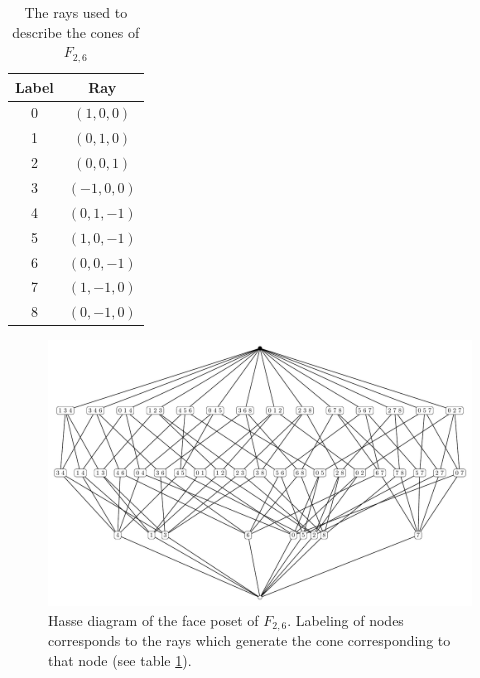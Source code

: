 \documentclass[12pt,letter]{article}
\begin{document}
\begin{table}[h!]\begin{centering}
	\begin{tabular}{c|c}
		Label & Ray\\
		\hline\hline
	0&	$(1, 0, 0)$\\
	1&$(0, 1, 0)$\\
2&	$(	0, 0 ,1)$\\
3&		$(-1, 0, 0)$\\
4&		$(0, 1, -1)$\\
5&		$(1, 0 ,-1)$\\
6&$(		0, 0 ,-1)$\\
7&$		(1 ,-1, 0)$\\
8&$		(0 ,-1, 0)$\\
		
	\end{tabular}\caption{The rays used to describe the cones of $F_{2,6}$\label{rays}}\end{centering}
\end{table}
\begin{figure}[h!]\begin{centering}
	\includegraphics[scale=.55]{f5h}\caption{\label{hasse} Hasse diagram of the face poset of $F_{2,6}$. Labeling of nodes corresponds to the rays which generate the cone corresponding to that node (see table \ref{rays}).}\end{centering}
\end{figure}
\end{document}
